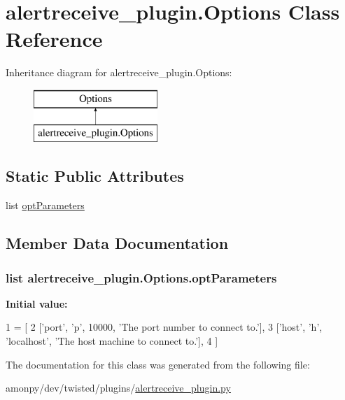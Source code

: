 \hypertarget{classalertreceive__plugin_1_1_options}{\section{alertreceive\-\_\-plugin.\-Options Class Reference}
\label{classalertreceive__plugin_1_1_options}
}
Inheritance diagram for alertreceive\-\_\-plugin.\-Options\-:\begin{figure}[H]
\begin{center}
\leavevmode
\includegraphics[height=2.000000cm]{classalertreceive__plugin_1_1_options}
\end{center}
\end{figure}
\subsection*{Static Public Attributes}
\begin{DoxyCompactItemize}
\item 
list \hyperlink{classalertreceive__plugin_1_1_options_a33de9f8dfdb7c8e7c1963b16b630eea1}{opt\-Parameters}
\end{DoxyCompactItemize}


\subsection{Member Data Documentation}
\hypertarget{classalertreceive__plugin_1_1_options_a33de9f8dfdb7c8e7c1963b16b630eea1}{
\subsubsection[{opt\-Parameters}]{\setlength{\rightskip}{0pt plus 5cm}list alertreceive\-\_\-plugin.\-Options.\-opt\-Parameters\hspace{0.3cm}{\ttfamily [static]}}}\label{classalertreceive__plugin_1_1_options_a33de9f8dfdb7c8e7c1963b16b630eea1}
{\bfseries Initial value\-:}
\begin{DoxyCode}
1 = [
2         [\textcolor{stringliteral}{'port'}, \textcolor{stringliteral}{'p'}, 10000, \textcolor{stringliteral}{'The port number to connect to.'}],
3         [\textcolor{stringliteral}{'host'}, \textcolor{stringliteral}{'h'}, \textcolor{stringliteral}{'localhost'}, \textcolor{stringliteral}{'The host machine to connect to.'}],
4         ]
\end{DoxyCode}


The documentation for this class was generated from the following file\-:\begin{DoxyCompactItemize}
\item 
amonpy/dev/twisted/plugins/\hyperlink{alertreceive__plugin_8py}{alertreceive\-\_\-plugin.\-py}\end{DoxyCompactItemize}
